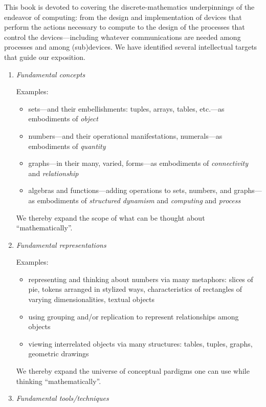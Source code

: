 This book is devoted to covering the discrete-mathematics
underpinnings of the endeavor of computing: from the design and
implementation of devices that perform the actions necessary to
compute to the design of the processes that control the
devices---including whatever communications are needed among processes
and among (sub)devices.  We have identified several intellectual
targets that guide our exposition.
\begin{enumerate}
\item
{\it Fundamental concepts}

\medskip

{\small\sf Examples:}
\begin{itemize}
\item%
sets---and their embellishments: tuples, arrays, tables, etc.---as
embodiments of {\it object}
\item
numbers---and their operational manifestations, numerals---as
embodiments of {\it quantity}
\item
graphs---in their many, varied, forms---as embodiments of {\it
  connectivity} and {\it relationship}
\item
algebras and functions---adding operations to sets, numbers, and
graphs---as embodiments of {\it structured dynamism} and {\it
  computing} and {\it process}
\end{itemize}
We thereby expand the scope of what can be thought about
``mathematically''.

\medskip

\item
{\it Fundamental representations}

\medskip

{\small\sf Examples:}
\begin{itemize}
\item
representing and thinking about numbers via many metaphors: slices of
pie, tokens arranged in stylized ways, characteristics of rectangles
of varying dimensionalities, textual objects
\item
using grouping and/or replication to represent relationships among
objects
\item
viewing interrelated objects via many structures: tables, tuples,
graphs, geometric drawings
\end{itemize}
We thereby expand the universe of conceptual pardigms one can use
while thinking ``mathematically''.

\medskip

\item
{\it Fundamental tools/techniques}


\end{enumerate}
